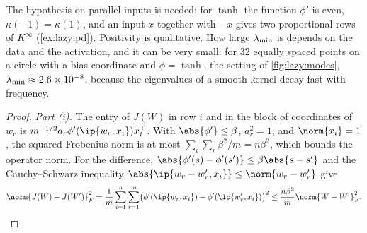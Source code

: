 \begin{refsection}
The hypothesis on parallel inputs is needed: for $\tanh$ the function $\phi'$ is even, $\kappa(-1)=\kappa(1)$, and an input $x$ together with $-x$ gives two proportional rows of $K^\infty$ (\cref{ex:lazy:pd}). Positivity is qualitative. How large $\lambda_{\min}$ is depends on the data and the activation, and it can be very small: for $32$ equally spaced points on a circle with a bias coordinate and $\phi=\tanh$, the setting of \cref{fig:lazy:modes}, $\lambda_{\min}\approx2.6\times10^{-8}$, because the eigenvalues of a smooth kernel decay fast with frequency.


\begin{proof}
\emph{Part (i).} The entry of $J(W)$ in row $i$ and in the block of coordinates of $w_r$ is $m^{-1/2}a_r\phi'(\ip{w_r,x_i})x_i^\top$. With $\abs{\phi'}\le\beta$, $a_r^2=1$, and $\norm{x_i}=1$, the squared Frobenius norm is at most $\sum_i\sum_r\beta^2/m=n\beta^2$, which bounds the operator norm. For the difference, $\abs{\phi'(s)-\phi'(s')}\le\beta\abs{s-s'}$ and the Cauchy--Schwarz inequality $\abs{\ip{w_r-w_r',x_i}}\le\norm{w_r-w_r'}$ give
\[
  \norm{J(W)-J(W')}_F^2=\frac1m\sum_{i=1}^n\sum_{r=1}^m\bigl(\phi'(\ip{w_r,x_i})-\phi'(\ip{w_r',x_i})\bigr)^2\le\frac{n\beta^2}m\norm{W-W'}_F^2 .
\]


\end{proof}
\end{refsection}
